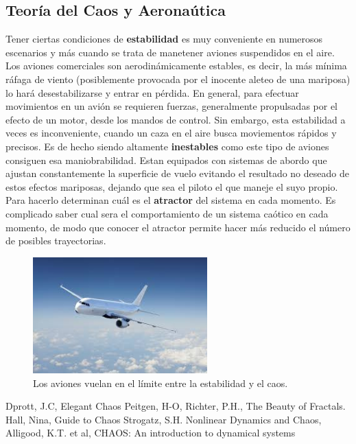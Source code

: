 \subsection{Teoría del Caos y Aeronaútica}
Tener ciertas condiciones de \textbf{estabilidad} es muy conveniente en numerosos escenarios y más cuando se trata de manetener aviones suspendidos en el aire. Los aviones comerciales son aerodinámicamente estables, es decir, la más mínima ráfaga de viento (posiblemente provocada por el inocente aleteo de una mariposa) lo hará desestabilizarse y entrar en pérdida. En general, para efectuar movimientos en un avión se requieren fuerzas, generalmente propulsadas por el efecto de un motor, desde los mandos de control. Sin embargo, esta estabilidad a veces es inconveniente, cuando un caza en el aire busca moviementos rápidos y precisos. Es de hecho siendo altamente \textbf{inestables} como este tipo de aviones consiguen esa maniobrabilidad. Estan equipados con sistemas de abordo que ajustan constantemente la superficie de vuelo evitando el resultado no deseado de estos efectos mariposas, dejando que sea el piloto el que maneje el suyo propio. Para hacerlo determinan cuál es el \textbf{atractor} del sistema en cada momento. Es complicado saber cual sera el comportamiento de un sistema caótico en cada momento, de modo que conocer el atractor permite hacer más reducido el número de posibles trayectorias.
\begin{figure}[hbtp]
\centering
\includegraphics[width = 0.6\textwidth]{img/aero.jpeg}
\caption{Los aviones vuelan en el límite entre la estabilidad y el caos.}
\label{fig:avionsito}
\end{figure}

\newpage

\begin{thebibliography}{1}
Dprott, J.C, Elegant Chaos
Peitgen, H-O, Richter, P.H., The Beauty of Fractals.
Hall, Nina, Guide to Chaos
Strogatz, S.H. Nonlinear Dynamics and Chaos,
Alligood, K.T. et al, CHAOS: An introduction to dynamical systems
\end{thebibliography}

